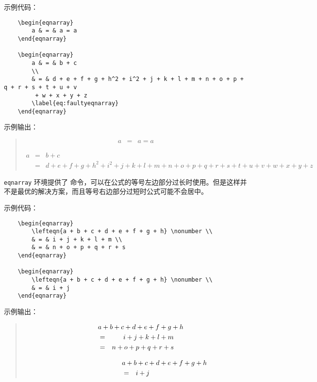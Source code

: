 \documentclass[UTF8]{ctexart}
\begin{document}
示例代码：
\begin{verbatim}
    \begin{eqnarray}
        a & = & a = a
    \end{eqnarray}

    \begin{eqnarray}
        a & = & b + c
        \\
        & = & d + e + f + g + h^2 + i^2 + j + k + l + m + n + o + p + q + r + s + t + u + v
         + w + x + y + z
        \label{eq:faultyeqnarray}
    \end{eqnarray}
\end{verbatim}

示例输出：
\begin{quote}
    \begin{eqnarray}
        a & = & a = a
    \end{eqnarray}

    \begin{eqnarray}
        a & = & b + c
        \\
        & = & d + e + f + g + h^2 + i^2 + j + k + l + m + n + o + p + q + r + s + t + u + v
         + w + x + y + z
        \label{eq:faultyeqnarray}
    \end{eqnarray}
\end{quote}

\texttt{eqnarray} 环境提供了 \texttt{\lefteqn} 命令，可以在公式的等号左边部分过长时使用。但是这样并
不是最优的解决方案，而且等号右边部分过短时公式可能不会居中。

示例代码：
\begin{verbatim}
    \begin{eqnarray}
        \lefteqn{a + b + c + d + e + f + g + h} \nonumber \\
        & = & i + j + k + l + m \\
        & = & n + o + p + q + r + s
    \end{eqnarray}

    \begin{eqnarray}
        \lefteqn{a + b + c + d + e + f + g + h} \nonumber \\
        & = & i + j
    \end{eqnarray}
\end{verbatim}

示例输出：
\begin{quote}
    \begin{eqnarray}
        \lefteqn{a + b + c + d + e + f + g + h} \nonumber \\
        & = & i + j + k + l + m \\
        & = & n + o + p + q + r + s
    \end{eqnarray}

    \begin{eqnarray}
        \lefteqn{a + b + c + d + e + f + g + h} \nonumber \\
        & = & i + j
    \end{eqnarray}
\end{quote}
\end{document}
